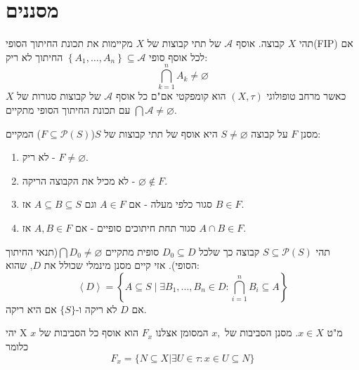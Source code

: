 \documentclass{tstextbook}
\begin{document}
\section{מסננים}

\begin{reminder}
תהי \(X\) קבוצה. אוסף \(\mathcal{A}\) של תתי קבוצות של \(X\) מקיימות את תכונת החיתוך הסופי(FIP) אם לכל אוסף סופי \(\left\{  A_{1},\dots,A_{n}  \right\}\subseteq \mathcal{A}\) החיתוך לא ריק:
$$\bigcap_{k=1}^{n}A_{k}\neq \varnothing $$
כאשר מרחב טופולוגי \(\left( X,\tau \right)\) הוא קומפקטי אם"ם כל אוסף \(\mathcal{A}\) של קבוצות סגורות של \(X\) עם תכונת החיתוך הסופי מתקיים \(\bigcap \mathcal{A}\neq \varnothing\).

\end{reminder}
\begin{definition}[מסנן]
מסנן \(F\) על קבוצה \(S\neq \varnothing\) היא אוסף של תתי קבוצות של \(S\)(\(F\subseteq \mathcal{P}(S)\)) המקיים:

  \begin{enumerate}
    \item לא ריק - \(F \neq \varnothing\). 


    \item לא מכיל את הקבוצה הריקה - \(\varnothing \not\in F\). 


    \item סגור כלפי מעלה - אם \(A \in F\) וגם \(A\subseteq B \subseteq S\) אז \(B\in F\). 


    \item סגור תחת חיתוכים סופיים - אם \(A,B \in F\) אז \(A\cap B \in F\). 


  \end{enumerate}
\end{definition}
\begin{proposition}
תהי \(S\subseteq \mathcal{P}(S)\) קבוצה כך שלכל \(D_{0} \subseteq D\) סופית מתקיים \(\bigcap D_{0} \neq \varnothing\)(תנאי החיתוך הסופי). אזי קיים מסנן מינמלי שכולל את \(D\), שהוא:
$$\left\langle D\right\rangle=\left\{A\subseteq S\mid\exists B_{1},...,B_{n}\in D:\bigcap_{i=1}^{n}B_{i}\subseteq A\right\}$$
אם \(D\) לא ריקה ו-\(\{ S \}\) אם היא ריקה.

\end{proposition}
\begin{definition}
יהי X מ"ט \(x\in X\). מסנן הסביבות של \(x,\) המסומן אצלנו \(F_{x}\) הוא אוסף כל הסביבות של \(x\) כלומר
$$F_{x}=\{N\subseteq X|\exists U\in\tau:x\in U\subseteq N\}$$

\end{definition}
\end{document}
